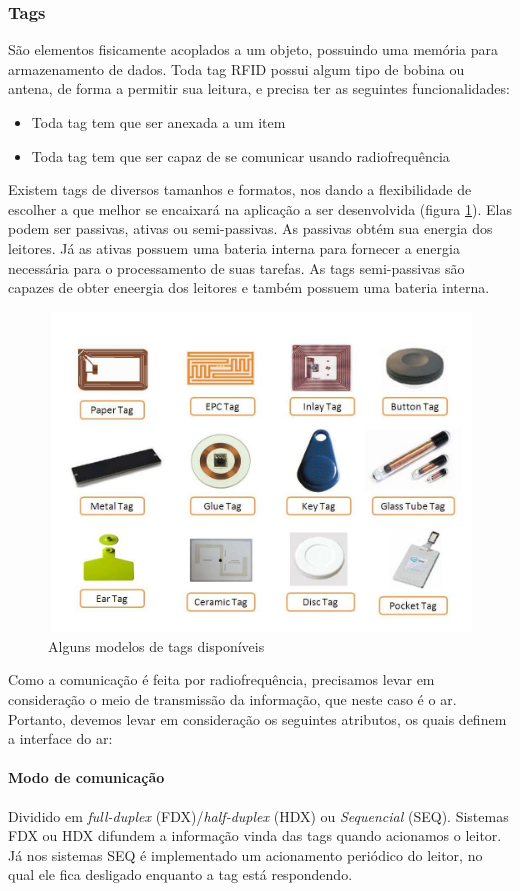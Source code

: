 	\subsubsection{Tags}
	São elementos fisicamente acoplados a um objeto, possuindo uma memória para armazenamento de dados. Toda tag RFID possui algum tipo de bobina ou antena, de forma a permitir sua leitura, e precisa ter as seguintes funcionalidades:
	
		\begin{itemize}
			\item Toda tag tem que ser anexada a um item
			\item Toda tag tem que ser capaz de se comunicar usando radiofrequência
		\end{itemize}
	

	 Existem tags de diversos tamanhos e formatos, nos dando a flexibilidade de escolher a que melhor se encaixará na aplicação a ser desenvolvida (figura \ref{fig:rfidtags}). Elas podem ser passivas, ativas ou semi-passivas. As passivas obtém sua energia dos leitores. Já as ativas possuem uma bateria interna para fornecer a energia necessária para o processamento de suas tarefas.	
	 As tags semi-passivas são capazes de obter eneergia dos leitores e também possuem uma bateria interna.
	 
		\begin{figure}[h!]
			\centering
			\includegraphics[width=0.5\linewidth]{rfidtagas}
			\caption{Alguns modelos de tags disponíveis}
			\label{fig:rfidtags}
		\end{figure}
	
	Como a comunicação é feita por radiofrequência, precisamos levar em consideração o meio de transmissão da informação, que neste caso é o ar. Portanto, devemos levar em consideração os seguintes atributos, os quais definem a interface do ar:   
	
	\paragraph{Modo de comunicação} Dividido em \textit{full-duplex} (FDX)/\textit{half-duplex} (HDX) ou \textit{Sequencial} (SEQ). Sistemas FDX ou HDX difundem a informação vinda das tags quando acionamos o leitor. Já nos sistemas SEQ é implementado um acionamento periódico do leitor, no qual ele fica desligado enquanto a tag está respondendo.	
